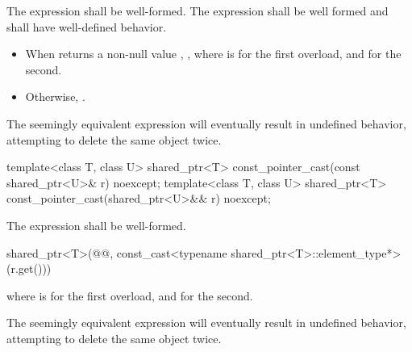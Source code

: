 \begin{itemdescr}
\pnum
\requires The expression 
shall be well-formed.
The expression 
shall be well formed and shall have well-defined behavior.

\pnum
\returns
\begin{itemize}
\item When 
  returns a non-null value ,
  ,
  where  is  for the first overload, and
   for the second.
\item Otherwise, .
\end{itemize}

\pnum
\begin{note}
The seemingly equivalent expression
 will eventually result in
undefined behavior, attempting to delete the same object twice.
\end{note}
\end{itemdescr}

%
\begin{itemdecl}
template<class T, class U>
  shared_ptr<T> const_pointer_cast(const shared_ptr<U>& r) noexcept;
template<class T, class U>
  shared_ptr<T> const_pointer_cast(shared_ptr<U>&& r) noexcept;
\end{itemdecl}

\begin{itemdescr}
\pnum
\requires The expression  shall
be well-formed.

\pnum
\returns
\begin{codeblock}
shared_ptr<T>(@@, const_cast<typename shared_ptr<T>::element_type*>(r.get()))
\end{codeblock}
where  is  for the first overload, and
 for the second.

\pnum
\begin{note}
The seemingly equivalent expression
 will eventually result in
undefined behavior, attempting to delete the same object twice.
\end{note}
\end{itemdescr}

